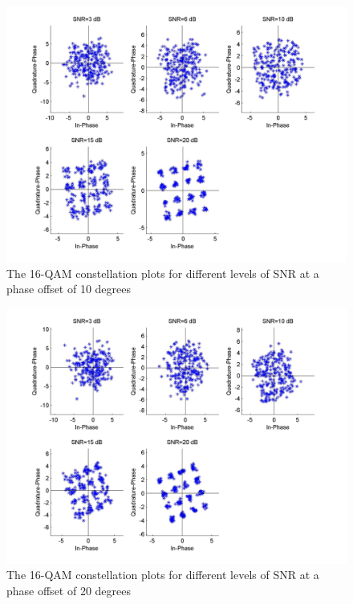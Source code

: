 \documentclass[]{article}
\begin{document}
\begin{figure}[H]
\centering
\hspace*{-2cm}\includegraphics[width=1.3\textwidth]{qam16Constpo2.jpg}
\caption{The 16-QAM constellation plots for different levels of SNR at a phase offset of 10 degrees}
\end{figure}

\begin{figure}[H]
\centering
\hspace*{-2cm}\includegraphics[width=1.3\textwidth]{qam16Constpo3.jpg}
\caption{The 16-QAM constellation plots for different levels of SNR at a phase offset of 20 degrees}
\end{figure}
\end{document}
